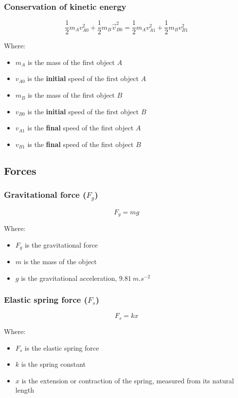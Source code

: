\documentclass[11pt]{article}
\begin{document}
\subsubsection{Conservation of kinetic energy}
\label{sec:orgf60c3c6}
\[\frac{1}{2} m_A v_{A0}^2 + \frac{1}{2} m_B \vec{v}_{B0}^2 = \frac{1}{2} m_A v_{A1}^2 + \frac{1}{2} m_B v_{B1}^2\]

Where:
\begin{itemize}
\item \(m_A\) is the mass of the first object \(A\)
\item \(v_{A0}\) is the \textbf{initial} speed of the first object \(A\)
\item \(m_B\) is the mass of the first object \(B\)
\item \(v_{B0}\) is the \textbf{initial} speed of the first object \(B\)
\item \(v_{A1}\) is the \textbf{final} speed of the first object \(A\)
\item \(v_{B1}\) is the \textbf{final} speed of the first object \(B\)
\end{itemize}
\subsection{Forces}
\label{sec:org8b94e03}

\subsubsection{Gravitational force (\(F_g\))}
\label{sec:org27ee6f1}
\[F_g = mg\]

Where:
\begin{itemize}
\item \(F_g\) is the gravitational force
\item \(m\) is the mass of the object
\item \(g\) is the gravitational acceleration, \(\qty{9.81}{m.s^{-2}}\)
\end{itemize}
\subsubsection{Elastic spring force (\(F_s\))}
\label{sec:org25f755f}
\[F_s = kx\]

Where:
\begin{itemize}
\item \(F_s\) is the elastic spring force
\item \(k\) is the spring constant
\item \(x\) is the extension or contraction of the spring, measured from its natural length
\end{itemize}
\end{document}

